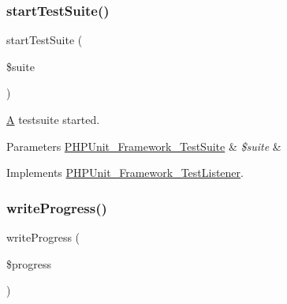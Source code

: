 \mbox{\label{class_p_h_p_unit___util___log___team_city_a901a86a623d83184267b21f2daee0ff5}} 
\subsubsection{\texorpdfstring{start\+Test\+Suite()}{startTestSuite()}}
{\footnotesize\ttfamily start\+Test\+Suite (\begin{DoxyParamCaption}\item[{\mbox{\hyperlink{class_p_h_p_unit___framework___test_suite}{P\+H\+P\+Unit\+\_\+\+Framework\+\_\+\+Test\+Suite}}}]{\$suite }\end{DoxyParamCaption})}

\mbox{\hyperlink{class_a}{A}} testsuite started.


\begin{DoxyParams}[1]{Parameters}
\mbox{\hyperlink{class_p_h_p_unit___framework___test_suite}{P\+H\+P\+Unit\+\_\+\+Framework\+\_\+\+Test\+Suite}} & {\em \$suite} & \\
\hline
\end{DoxyParams}


Implements \mbox{\hyperlink{interface_p_h_p_unit___framework___test_listener_a901a86a623d83184267b21f2daee0ff5}{P\+H\+P\+Unit\+\_\+\+Framework\+\_\+\+Test\+Listener}}.

\mbox{\label{class_p_h_p_unit___util___log___team_city_ae4b5d735668488399d06c4af87fe32fb}} 
\subsubsection{\texorpdfstring{write\+Progress()}{writeProgress()}}
{\footnotesize\ttfamily write\+Progress (\begin{DoxyParamCaption}\item[{}]{\$progress }\end{DoxyParamCaption})\hspace{0.3cm}{\ttfamily [protected]}}


